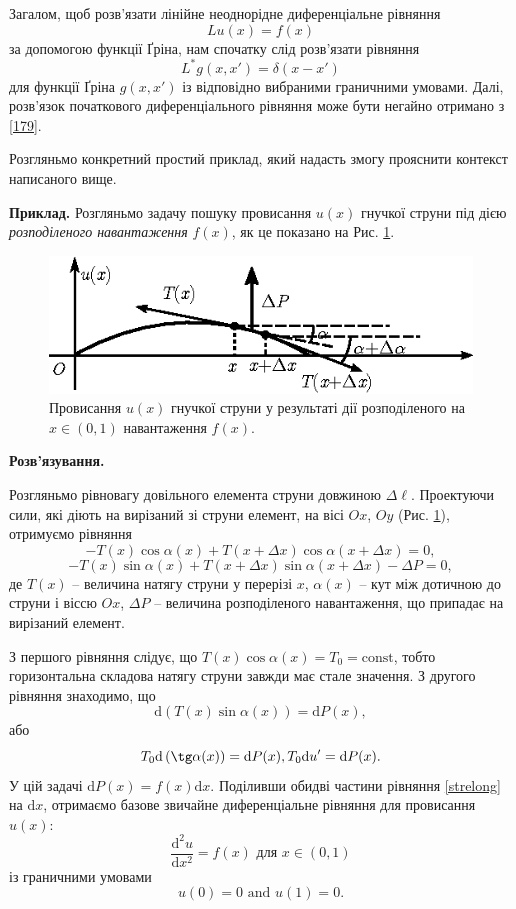 \documentclass[14pt,twoside]{extreport}
\theoremstyle{mystyle}
\numberwithin{equation}{chapter}
\begin{document}
Загалом, щоб розв'язати лінійне неоднорідне диференціальне рівняння
$$
L u(x)=f(x)
$$
за допомогою функції Ґріна, нам спочатку слід розв'язати рівняння
$$
L^{*}g(x, x')=\delta(x-x')
$$
для функції Ґріна $g(x, x')$ із відповідно вибраними граничними умовами. Далі, розв'язок початкового диференціального рівняння може бути негайно отримано з \eqref{179}.

Розгляньмо конкретний простий приклад, який надасть змогу прояснити контекст написаного вище.

\textbf{Приклад.} Розгляньмо задачу пошуку провисання $u(x)$ гнучкої струни під дією \emph{розподіленого навантаження} $f(x)$, як це показано на Рис. \ref{figstring}.

\begin{figure}[ht]\centering
	\includegraphics[scale=1]{string1.eps}
	\caption{Провисання $u(x)$ гнучкої струни у результаті дії розподіленого на $x\in(0, 1)$ навантаження $f(x)$.}\label{figstring}
\end{figure}

\textbf{Розв'язування.}

Розгляньмо рівновагу довільного елемента струни довжиною $\Delta \ell$. Проектуючи сили, які діють на вирізаний зі струни елемент, на вісі $Ox$, $Oy$ (Рис. \ref{figstring}), отримуємо рівняння
\[
-T(x)\cos \alpha(x) + T(x + \Delta x)\cos \alpha(x + \Delta x) = 0,
\]
\[
-T(x) \sin\alpha(x) + T(x + \Delta x) \sin\alpha(x + \Delta x) - \Delta P = 0,
\]
де $T(x)$ -- величина натягу струни у перерізі $x$, $\alpha(x)$ -- кут між дотичною до струни і віссю $Ox$, $\Delta P$ -- величина розподіленого навантаження, що припадає на вирізаний елемент.

З першого рівняння слідує, що $T(x) \cos \alpha(x) = T_0 = \textrm{const}$, тобто горизонтальна складова натягу струни завжди має стале значення. З другого рівняння знаходимо, що
\[
\mathrm{d}\left(T(x) \sin\alpha(x)\right) = \mathrm{d}P(x),
\]
або
\begin{equation}\label{strelong}
T_0\mathrm{d}\left(\tg \alpha(x)\right) = \mathrm{d} P(x), T_0 \mathrm{d}u' = \mathrm{d}P(x).
\end{equation}
У цій задачі $\mathrm{d}P(x) = f(x) \mathrm{d}x$. Поділивши обидві частини рівняння \eqref{strelong} на $\mathrm{d}x$, отримаємо базове звичайне диференціальне рівняння для провисання $u(x)$:
\begin{equation}\label{1710}
\displaystyle \frac{\mathrm{d}^{2}u}{\mathrm{d}x^{2}}=f(x)\textrm{ для }x\in(0,1)
\end{equation}
із граничними умовами
\begin{equation}\label{1711}
u(0)=0\textrm{ and }u(1)=0.
\end{equation}
\end{document}
